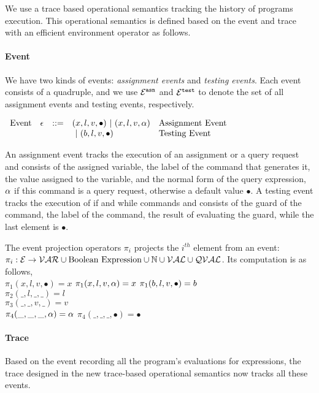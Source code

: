

We use a trace based operational semantics tracking the history of programs execution.
This operational semantics is defined based on the event and trace with an efficient 
environment operator as follows.


\paragraph{Event}
We have two kinds of events: \emph{assignment events} and \emph{testing events}. 
Each event consists of a quadruple,
and we use $\mathcal{E}^{\mathtt{{asn}}}$ and $\mathcal{E}^{\mathtt{{test}}}$ to denote the set of all assignment events and testing events, respectively.
\begin{center}
$ \begin{array}{lllll}
\mbox{Event} 
& \mathtt{\epsilon} & ::= & 
({x}, l, v, \bullet) ~|~ ({x}, l, v, \alpha)  & \mbox{Assignment Event} \\
&&& ~|~(b, l, v, \bullet)  & \mbox{Testing Event}
\\
\end{array}$
\end{center}
An assignment event tracks the execution of an assignment  or a query request and consists of the assigned variable, the label of the command that generates it, the value assigned to the variable, and the normal form of the query expression, $\alpha$ if this command is a query request, otherwise a default value $\bullet$.
A testing event tracks the execution of if and while commands and consists of the guard of the command, the label of the command, the result of evaluating the guard, while the last element is $\bullet$.

The event projection operators $\pi_i$ projects the $i^{th}$ element from an event:
$ \pi_i : 
\mathcal{E} \to \mathcal{VAR}\cup \mbox{Boolean Expression}  \cup \mathbb{N} \cup \mathcal{VAL} \cup \mathcal{QVAL} $.
Its computation is as follows,
\\
$\pi_1(x, l, v, \bullet) = x $ \qquad  $\pi_1({x}, l, v, \alpha) = x$ \qquad $ \pi_1(b, l, v, \bullet) = b$
\\
$\pi_2(\_, l, \_, \_ ) = l$
\\
$\pi_3(\_, \_, v, \_) = v$
\\
$\pi_4(\_, \_, \_, \alpha) = \alpha$ \qquad $\pi_4(\_, \_, \_, \bullet) = \bullet$

\paragraph{Trace}
Based on the event recording all the program's evaluations for expressions, 
 the trace designed in the new trace-based operational semantics
 now tracks all these events.

